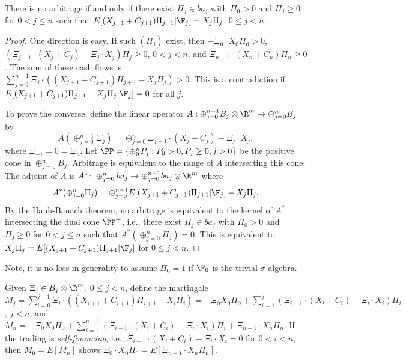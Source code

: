 \begin{theorem}
There is no arbitrage if and only if there exist
$\Pi_j\in ba_j$ with $\Pi_0 > 0$ and $\Pi_j\ge0$ for $0 < j \le n$ 
such that $E[(X_{j+1} + C_{j+1})\Pi_{j+1}|\F_j] = X_j\Pi_j$, $0\le j < n$.
\end{theorem}
\begin{proof}
One direction is easy. If such $(\Pi_j)$ exist, then 
$-\Xi_0\cdot X_0\Pi_0 > 0$, 
$(\Xi_{j - 1}\cdot (X_j + C_j) - \Xi_j\cdot X_j)\Pi_j \ge0$, $0 < j < n$,
and $\Xi_{n-1}\cdot (X_n + C_n)\Pi_n\ge0$. 
The sum of these cash flows is
$\sum_{j=0}^{n-1} \Xi_j\cdot((X_{j+1} + C_{j+1})\Pi_{j+1} - X_j\Pi_j) > 0$.
This is a contradiction if
$E[(X_{j+1} + C_{j+1})\Pi_{j+1} - X_j\Pi_j|\F_j] = 0$ for all $j$.

To prove the converse, define the linear operator 
$A:\oplus_{j = 0}^{n-1} B_j\otimes\R^m\to\oplus_{j = 0}^{n} B_j$ by
\begin{equation*}
A(\oplus_{j=0}^{n-1}\Xi_j) =
\oplus_{j=0}^n \Xi_{j - 1}\cdot (X_j + C_j) - \Xi_j\cdot X_j,
\end{equation*}
where $\Xi_{-1} = 0 = \Xi_n$.
Let $\PP = \{\oplus_0^n P_j:P_0 > 0, P_j\ge0, j > 0\}$ be the
positive cone in $\oplus_{j = 0}^{n} B_j$.
Arbitrage is equivalent to the range of $A$ intersecting this cone.
The adjoint of $A$ is
$A^*\colon\oplus_{j = 0}^{n} ba_j\to
\oplus_{j = 0}^{n-1} ba_j\otimes\R^m$ where
\begin{equation*}
A^*(\oplus_{j=0}^n \Pi_j) =
\oplus_{j=0}^{n-1} E[(X_{j+1} + C_{j+1})\Pi_{j+1}|\F_j] - X_j\Pi_j.
\end{equation*}
By the Hanh-Banach theorem, no arbitrage is equivalent to the kernel of
$A^*$ intersecting
the dual cone $\PP^+$, i.e., there exist
$\Pi_j\in ba_j$ with $\Pi_0 > 0$ and
$\Pi_j\ge0$ for $0 < j \le n$ such that
$A^*(\oplus_{j=0}^n \Pi_j) = 0$.
This is equivalent to $X_j\Pi_j
= E[(X_{j+1} + C_{j+1})\Pi_{j+1}|\F_j]$ for $0\le j < n$.
\end{proof}

Note, it is no loss in generality to assume $\Pi_0 = 1$ if $\F_0$ is
the trivial $\sigma$-algebra.

Given $\Xi_j\in B_j\otimes\R^m$, $0\le j < n$, define the martingale 
$M_j = \sum_{i = 0}^{j-1}\Xi_i\cdot((X_{i+1} + C_{i+1})\Pi_{i+1} - X_i\Pi_i)
= -\Xi_0 X_0 \Pi_0
+ \sum_{i = 1}^j (\Xi_{i-1}\cdot(X_i + C_i) - \Xi_i\cdot X_i)\Pi_i$,
$j < n$, and $M_n = -\Xi_0 X_0 \Pi_0 
+ \sum_{i = 1}^{n-1} (\Xi_{i-1}\cdot(X_i + C_i) - \Xi_i\cdot X_i)\Pi_i + \Xi_{n-1}\cdot X_n\Pi_n$.
If the trading is {\em self-financing}, i.e.,
$\Xi_{i - 1}\cdot(X_i + C_i) - \Xi_i\cdot X_i = 0$ for $0 < i < n$,
then $M_0 = E[M_n]$ shows $\Xi_0\cdot X_0\Pi_0 = E[\Xi_{n - 1}\cdot X_n\Pi_n]$.

